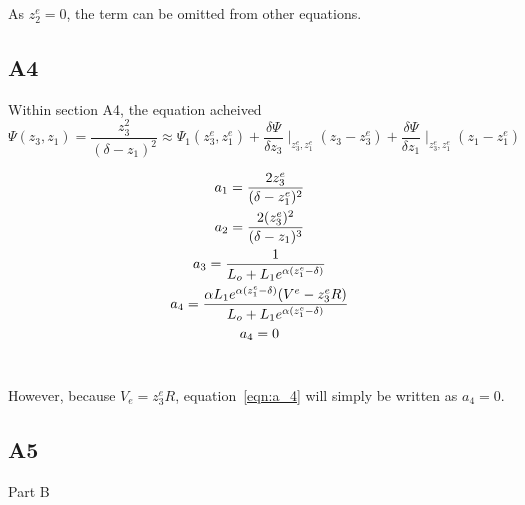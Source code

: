 \documentclass[a4paper,10pt,reqno]{amsart}
\makeatletter
\def\section{\@startsection{section}{1}%
  \z@{.7\linespacing\@plus\linespacing}{.5\linespacing}%
  {\bfseries\scshape\centering}}
\numberwithin{equation}{section}
\makeatother
\begin{document}
\par As $z_2^e=0$, the term can be omitted from other equations.

\subsection{A4}\label{sec:A4}

\par Within section A4, the equation acheived 
\begin{equation}
    \Psi(z_3,z_1)=\frac{z_3^2}{(\delta-z_1)^2}\approx\Psi_1(z_3^e,z_1^e)+\frac{\delta\Psi}{\delta z_3}\mid_{z_3^e,z_1^e}(z_3-z_3^e)+\frac{\delta\Psi}{\delta z_1}\mid_{z_3^e,z_1^e}(z_1-z_1^e)
\end{equation}

\begin{gather}
    a_1=\frac{2z_3^e}{(\delta-z_1^e)^2}
    \\
    a_2=\frac{2(z_3^e)^2}{(\delta-z_1)^3}
    \\
    a_3=\frac{1}{L_o+L_1e^{\alpha(z_1^e-\delta)}}
    \\
    a_4=\frac{\alpha L_1e^{\alpha(z_1^e-\delta)}(V^e-z_3^eR)}{L_o+L_1e^{\alpha(z_1^e-\delta)}}
    \label{eqn:a_4}\\
    a_4=0
    \notag
\end{gather}
\\
\par However, because $V_e=z_3^eR$, equation~\ref{eqn:a_4} will simply be written as $a_4=0$.

\subsection{A5}\label{sec:A5} 



\section{Part B}
\end{document}
